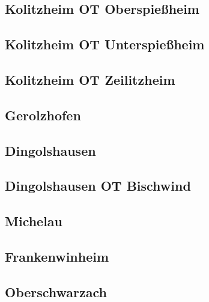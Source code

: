 \documentclass[fontsize=12pt,a4paper]{scrreprt}
\begin{document}
\begin{landscape}
                \subsection{Kolitzheim OT Oberspießheim}
                
                
                \subsection{Kolitzheim OT Unterspießheim}
                
                
                \subsection{Kolitzheim OT Zeilitzheim}
                
                
                \subsection{Gerolzhofen}
                
                
                \subsection{Dingolshausen}
                
                
                \subsection{Dingolshausen OT Bischwind}
                
                
                \subsection{Michelau}
                
                
                \subsection{Frankenwinheim}
                
                
                \subsection{Oberschwarzach}
                
                

\end{landscape}
\end{document}
